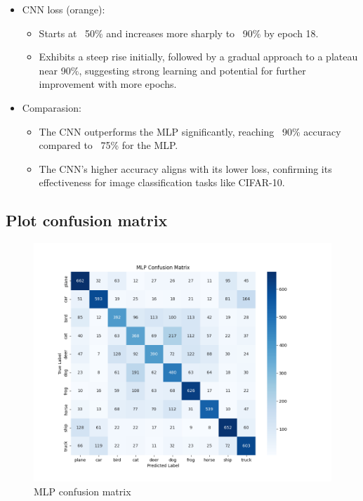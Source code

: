 \documentclass[a4paper,12pt]{article}
\begin{document}
\begin{enumerate}
\begin{itemize}
        \item CNN loss (orange):
        \begin{itemize}
            \item Starts at ~50\% and increases more sharply to ~90\% by epoch 18.
            
            \item Exhibits a steep rise initially, followed by a gradual approach to a plateau near 90\%, suggesting strong learning and potential for further improvement with more epochs.
        \end{itemize}

        \item Comparasion:
        \begin{itemize}
            \item The CNN outperforms the MLP significantly, reaching ~90\% accuracy compared to ~75\% for the MLP.
            
            \item The CNN's higher accuracy aligns with its lower loss, confirming its effectiveness for image classification tasks like CIFAR-10.
        \end{itemize}
    \end{itemize}
\end{enumerate}
\newpage

\subsection{Plot confusion matrix}

\begin{figure}[h]
    \centering
    \includegraphics[width=0.9\linewidth]{images/mlp_confusion_matrix.png}
    \caption{MLP confusion matrix}
    \label{fig:enter-label}
\end{figure}
\end{document}
